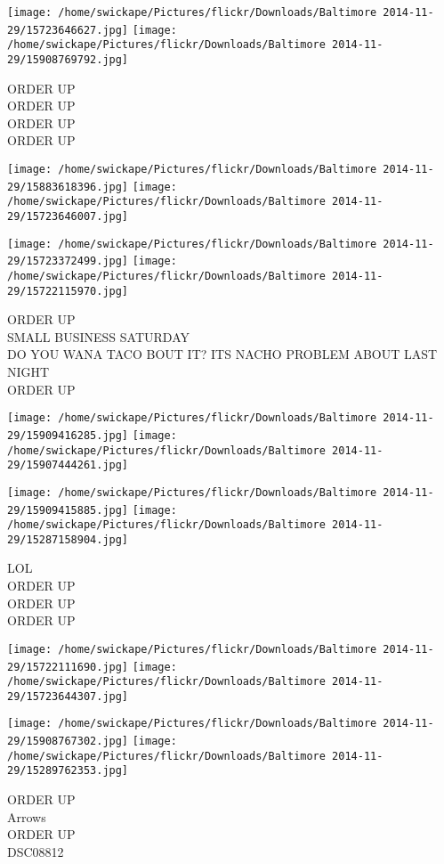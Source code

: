 \documentclass[10pt,letterpaper]{article}
\begin{document}
\texttt{[image: /home/swickape/Pictures/flickr/Downloads/Baltimore 2014-11-29/15723646627.jpg]}
\texttt{[image: /home/swickape/Pictures/flickr/Downloads/Baltimore 2014-11-29/15908769792.jpg]}

ORDER UP\\
ORDER UP\\
ORDER UP\\
ORDER UP
\pagebreak

\texttt{[image: /home/swickape/Pictures/flickr/Downloads/Baltimore 2014-11-29/15883618396.jpg]}
\texttt{[image: /home/swickape/Pictures/flickr/Downloads/Baltimore 2014-11-29/15723646007.jpg]}

\texttt{[image: /home/swickape/Pictures/flickr/Downloads/Baltimore 2014-11-29/15723372499.jpg]}
\texttt{[image: /home/swickape/Pictures/flickr/Downloads/Baltimore 2014-11-29/15722115970.jpg]}

ORDER UP\\
SMALL BUSINESS SATURDAY\\
DO YOU WANA TACO BOUT IT?  ITS NACHO PROBLEM ABOUT LAST NIGHT\\
ORDER UP
\pagebreak

\texttt{[image: /home/swickape/Pictures/flickr/Downloads/Baltimore 2014-11-29/15909416285.jpg]}
\texttt{[image: /home/swickape/Pictures/flickr/Downloads/Baltimore 2014-11-29/15907444261.jpg]}

\texttt{[image: /home/swickape/Pictures/flickr/Downloads/Baltimore 2014-11-29/15909415885.jpg]}
\texttt{[image: /home/swickape/Pictures/flickr/Downloads/Baltimore 2014-11-29/15287158904.jpg]}

LOL\\
ORDER UP\\
ORDER UP\\
ORDER UP
\pagebreak

\texttt{[image: /home/swickape/Pictures/flickr/Downloads/Baltimore 2014-11-29/15722111690.jpg]}
\texttt{[image: /home/swickape/Pictures/flickr/Downloads/Baltimore 2014-11-29/15723644307.jpg]}

\texttt{[image: /home/swickape/Pictures/flickr/Downloads/Baltimore 2014-11-29/15908767302.jpg]}
\texttt{[image: /home/swickape/Pictures/flickr/Downloads/Baltimore 2014-11-29/15289762353.jpg]}

ORDER UP\\
Arrows\\
ORDER UP\\
DSC08812
\pagebreak
\end{document}
